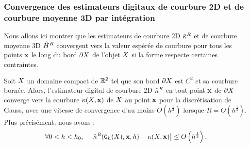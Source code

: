 \subsubsection{Convergence des estimateurs digitaux de courbure 2D et de courbure moyenne 3D par intégration}
%
Nous allons ici montrer que les estimateurs de courbure 2D $\hat{\kappa}^{R}$ et de
courbure moyenne 3D $\hat{H}^{R}$ convergent vers la valeur espérée de
courbure pour tous les points $\mathbf{x}$ le long du bord $\partial X$ de l'objet $X$ si
la forme respecte certaines contraintes.\\
%
\begin{theorem}
  \label{thm:convergence-curv-2d}
  Soit $X$ un domaine compact de $\mathbb{R}^2$ tel que son bord $\partial X$ est $C^2$ et
  sa courbure bornée. Alors, l'estimateur digital de courbure 2D $\hat{\kappa}^{R}$ en
  tout point $\mathbf{x}$ de $\partial X$ converge vers la courbure
  $\kappa(X,\mathbf{x})$ de $X$ au point $\mathbf{x}$ pour la discrétisation de
  Gauss, avec une vitesse de convergence d'au moins $O(h^{\frac{1}{3}})$ lorsque
  $R = O(h^{\frac{1}{3}})$. Plus précisément, nous avons :
  \begin{equation}
    \forall 0 < h < h_0,
    \quad \left | \CurvH{R}(\DSh, \vx, h) - \Curv(\Shape, \vx) \right|
                          \le O \left(h^{\frac{1}{3}}\right). %
  \end{equation}
\end{theorem}
